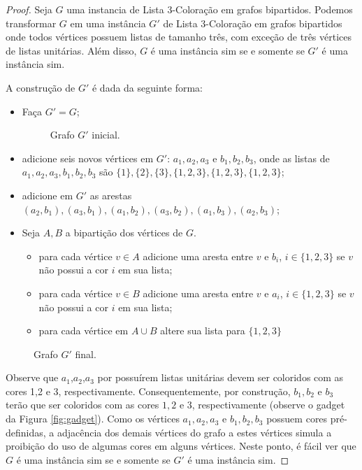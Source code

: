 \begin{proof}
Seja $G$ uma instancia de Lista 3-Coloração em grafos bipartidos. Podemos transformar $G$ em uma instância $G'$ de Lista 3-Coloração em grafos bipartidos onde todos vértices possuem listas de tamanho três, com exceção de três vértices de listas unitárias. Além disso, $G$ é uma instância sim se e somente se $G'$ é uma instância sim.

A construção de $G'$ é dada da seguinte forma:

\begin{itemize}
\item Faça $G'=G$;
\begin{figure}[H]
		\centering
		\fontsize{5}{10}
		
		\caption{Grafo $G'$ inicial. }
\end{figure}
\item adicione seis novos vértices em $G'$: $a_1,a_2,a_3$ e $b_1,b_2,b_3$, onde as listas de $a_1,a_2,a_3,b_1,b_2,b_3$ são $\{1\},\{2\},\{3\},\{1,2,3\},\{1,2,3\},\{1,2,3\}$;
\begin{figure}[H]
		\centering
		\fontsize{5}{10}
		
\end{figure}
\item adicione em $G'$ as arestas $(a_2,b_1),(a_3,b_1),(a_1,b_2),(a_3,b_2),(a_1,b_3),(a_2,b_3)$;
\begin{figure}[H]
		\centering
		\fontsize{5}{10}
		
\end{figure}
\item Seja $A,B$ a bipartição dos vértices de $G$. 
\begin{itemize}
\item para cada vértice $v\in A$ adicione uma aresta entre $v$ e $b_i$, $i\in\{1,2,3\}$ se $v$ não possui a cor $i$ em sua lista;
\item para cada vértice $v\in B$ adicione uma aresta entre $v$ e $a_i$, $i\in\{1,2,3\}$ se $v$ não possui a cor $i$ em sua lista;
\item para cada vértice em $A\cup B$ altere sua lista para $\{1,2,3\}$
\end{itemize}
\end{itemize}

\begin{figure}[H]
		\centering
		\fontsize{5}{10}
		
		\caption{Grafo $G'$ final. }
		\label{fig:seis-vertices-lista-um}
\end{figure}


Observe que $a_1$,$a_2$,$a_3$ por possuírem listas unitárias devem ser coloridos com as cores 1,2 e 3, respectivamente. Consequentemente, por construção, $b_1,b_2$ e $b_3$ terão que ser coloridos com as cores $1,2$ e $3$, respectivamente (observe o gadget da Figura \ref{fig:gadget}). Como os vértices $a_1,a_2,a_3$ e $b_1,b_2,b_3$ possuem cores pré-definidas, a adjacência dos demais vértices do grafo a estes vértices simula a proibição do uso de algumas cores em alguns vértices. Neste ponto, é fácil ver que $G$ é uma instância sim se e somente se $G'$ é uma instância sim.
\end{proof}


